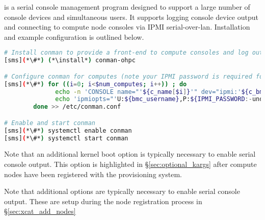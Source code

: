 \conman{} is a serial console management program designed to support a large
number of console devices and simultaneous users. It supports logging console
device output and connecting to compute node consoles via IPMI
serial-over-lan. Installation and example configuration is outlined below.

\begin{lstlisting}[language=bash,keywords={},upquote=true]
# Install conman to provide a front-end to compute consoles and log output
[sms](*\#*) (*\install*) conman-ohpc

# Configure conman for computes (note your IPMI password is required for console access)
[sms](*\#*) for ((i=0; i<$num_computes; i++)) ; do
              echo -n 'CONSOLE name="'${c_name[$i]}'" dev="ipmi:'${c_bmc[$i]}'" '
              echo 'ipmiopts="'U:${bmc_username},P:${IPMI_PASSWORD:-undefined},W:solpayloadsize'"'
        done >> /etc/conman.conf

# Enable and start conman
[sms](*\#*) systemctl enable conman
[sms](*\#*) systemctl start conman
\end{lstlisting}

\noindent Note that an additional kernel boot option is typically necessary to
enable serial console output. This option is highlighted in \S\ref{sec:optional_kargs} after
compute nodes have been registered with the provisioning system.
\fi

\noindent Note that additional options are typically necessary to
enable serial console output. These are setup during the node registration
process in \S\ref{sec:xcat_add_nodes}
\fi


